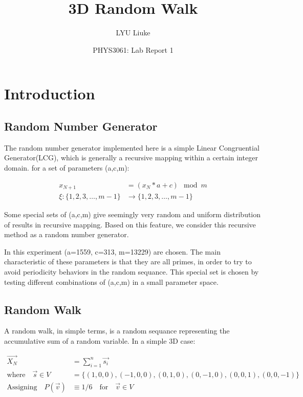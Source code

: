 \documentclass{article}
\title{3D Random Walk}
\author{LYU Liuke}
\date{PHYS3061: Lab Report 1}
\begin{document}
\maketitle
\tableofcontents
\clearpage

\section{Introduction}

\subsection{Random Number Generator}

The random number generator implemented here is a simple Linear Congruential
Generator(LCG), which is generally a recursive mapping within a certain integer
domain. for a set of parameters (a,c,m):

\begin{align*}
  x_{N+1} &= (x_N * a + c) \mod m \\
  \xi \colon \{1,2,3,\dots,m-1\} &\to \{1,2,3,\dots,m-1\}
\end{align*}

Some special sets of (a,c,m) give seemingly very random and uniform distribution
of results in recursive mapping. Based on this feature, we consider this recursive 
method as a random number generator. 

In this experiment (a=1559, c=313, m=13229) are chosen. 
The main characteristic of these parameters is that they are all primes, in order
to try to avoid periodicity behaviors in the random sequance.
This special set is chosen by testing different combinations of (a,c,m) in a
small parameter space.

\subsection{Random Walk}
  
A random walk, in simple terms, is a random sequance representing the 
accumulative sum of a random variable. In a simple 3D case:

\begin{align*}
  \vec{X_N} &= \sum_{i=1}^{n} \vec{s_i} \\
  \mbox{where} \quad  \vec{s} \in V &= \{(1,0,0), (-1,0,0), (0,1,0), (0,-1,0), (0,0,1),(0,0,-1)\} \\
  \mbox{Assigning} \quad P(\vec{v}) &\equiv 1/6 \quad \mbox{for}  \quad \vec{v} \in V
\end{align*}
\end{document}

